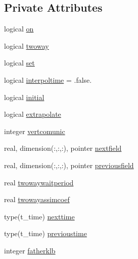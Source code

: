 \subsection*{Private Attributes}
\begin{DoxyCompactItemize}
\item 
logical \mbox{\hyperlink{structmodulewaterproperties_1_1t__submodel_ae320087128887b624f27a81436d9fdb1}{on}}
\item 
logical \mbox{\hyperlink{structmodulewaterproperties_1_1t__submodel_a9a164313344c8b6fdefcf5f0616d0c42}{twoway}}
\item 
logical \mbox{\hyperlink{structmodulewaterproperties_1_1t__submodel_a771b6602584d5e62a8c0ecd3155d1fa8}{set}}
\item 
logical \mbox{\hyperlink{structmodulewaterproperties_1_1t__submodel_a5f77ca105dfa8ab1933b6c79d47d0dd9}{interpoltime}} = .false.
\item 
logical \mbox{\hyperlink{structmodulewaterproperties_1_1t__submodel_a16a6cd7b0f8c063b966b431a2da1fe88}{initial}}
\item 
logical \mbox{\hyperlink{structmodulewaterproperties_1_1t__submodel_aedb7a25e314b267f7f93b829141773c6}{extrapolate}}
\item 
integer \mbox{\hyperlink{structmodulewaterproperties_1_1t__submodel_aa630690e5dfb3975e9e39ec4a411c9e7}{vertcomunic}}
\item 
real, dimension(\+:,\+:,\+:), pointer \mbox{\hyperlink{structmodulewaterproperties_1_1t__submodel_a1499028e3ad24e583d1969db42fa9fa3}{nextfield}}
\item 
real, dimension(\+:,\+:,\+:), pointer \mbox{\hyperlink{structmodulewaterproperties_1_1t__submodel_a34b82d2bf3c8ddc1d152897fd33eefb1}{previousfield}}
\item 
real \mbox{\hyperlink{structmodulewaterproperties_1_1t__submodel_abbdaad92e13469bfd88c52f184c7650c}{twowaywaitperiod}}
\item 
real \mbox{\hyperlink{structmodulewaterproperties_1_1t__submodel_a831cc7b0ab66656b76fe59d9b8ce16de}{twowayassimcoef}}
\item 
type(t\+\_\+time) \mbox{\hyperlink{structmodulewaterproperties_1_1t__submodel_aff2a409deb716932e70392041c9ede4d}{nexttime}}
\item 
type(t\+\_\+time) \mbox{\hyperlink{structmodulewaterproperties_1_1t__submodel_abc5a67ad1150dd1d9b8a7abcc0fcab8a}{previoustime}}
\item 
integer \mbox{\hyperlink{structmodulewaterproperties_1_1t__submodel_a634beb293d5d3cb85c3d52c74efd4cb6}{fatherklb}}

\end{DoxyCompactItemize}
